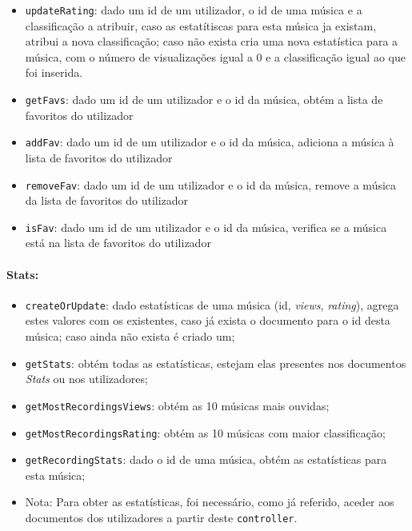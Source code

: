 \documentclass{article}
\begin{document}
\begin{itemize}
        \item \texttt{updateRating}: dado um id de um utilizador, o id de uma música e a classificação a atribuir, caso as estatítiscas para esta música ja existam, atribui a nova classificação; caso não exista cria uma nova estatística para a música, com o número de visualizações igual a 0 e a classificação igual ao que foi inserida.
        \item \texttt{getFavs}: dado um id de um utilizador e o id da música, obtém a lista de favoritos do utilizador
        \item \texttt{addFav}: dado um id de um utilizador e o id da música, adiciona a música à lista de favoritos do utilizador
        \item \texttt{removeFav}: dado um id de um utilizador e o id da música, remove a música da lista de favoritos do utilizador
        \item \texttt{isFav}: dado um id de um utilizador e o id da música, verifica se a música está na lista de favoritos do utilizador

    \end{itemize}

\paragraph{\textbf{Stats:}}
    \begin{itemize}
        \item \texttt{createOrUpdate}: dado estatísticas de uma música (id, \textit{views}, \textit{rating}), agrega estes valores com os existentes, caso já exista o documento para o id desta música; caso ainda não exista é criado um;
        \item \texttt{getStats}: obtém todas as estatísticas, estejam elas presentes nos documentos \textit{Stats} ou nos utilizadores;
        \item \texttt{getMostRecordingsViews}: obtém as 10 músicas mais ouvidas;
        \item \texttt{getMostRecordingsRating}: obtém as 10 músicas com maior classificação;
        \item \texttt{getRecordingStats}: dado o id de uma música, obtém as estatísticas para esta música;
        \item Nota: Para obter as estatísticas, foi necessário, como já referido, aceder aos documentos dos utilizadores a partir deste \texttt{controller}.
    \end{itemize}
\end{document}
